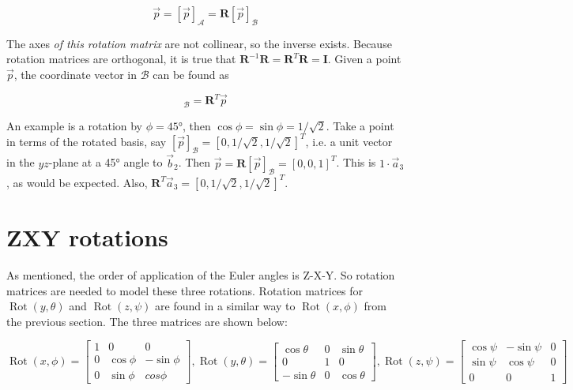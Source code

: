 \documentclass[a4paper]{report}
\DeclareMathOperator{\Rot}{Rot}
\newcommand{\matr}[1]{\mathbf{#1}}
\begin{document}
\begin{equation}
\vec{p} = [\vec{p}]_\mathcal{A} = \matr{R} [\vec{p}]_\mathcal{B}
\end{equation}

The axes \textit{of this rotation matrix} are not collinear, so the inverse exists. Because rotation matrices are orthogonal, it is true that $\matr{R}^{-1} \matr{R} = \matr{R}^{T} \matr{R} = \matr{I}$. Given a point $\vec{p}$, the coordinate vector in $\mathcal{B}$ can be found as 

\begin{equation}
[\vec{p}]_\mathcal{B} = \matr{R}^T \vec{p}
\end{equation}

An example is a rotation by $\phi=45$°, then $\cos \phi = \sin \phi = 1/\sqrt{2}$.
Take a point in terms of the rotated basis, say $[\vec{p}]_\mathcal{B} = [0, 1/\sqrt{2}, 1/\sqrt{2}]^T$, i.e. a unit vector in the $yz$-plane at a 45° angle to $\vec{b}_2$.
Then $\vec{p}=\matr{R} [\vec{p}]_\mathcal{B} = [0, 0, 1 ]^T$. This is $1 \cdot \vec{a}_3$, as would be expected.
Also, $\matr{R}^T \vec{a}_3 = [0, 1/\sqrt{2}, 1/\sqrt{2}]^T$.

\section{ZXY rotations}

As mentioned, the order of application of the Euler angles is Z-X-Y.
So rotation matrices are needed to model these three rotations. Rotation matrices for $\Rot(y, \theta)$ and $\Rot(z, \psi)$ are found in a similar way to $\Rot(x, \phi)$ from the previous section. The three matrices are shown below:

\begin{equation}
\Rot(x, \phi)=
\begin{bmatrix}
1 & 0 & 0\\
0 & \cos\phi & -\sin\phi \\
0 & \sin\phi & cos\phi
\end{bmatrix},
\Rot(y, \theta)=
\begin{bmatrix}
\cos\theta & 0 &  \sin\theta \\
0 & 1 & 0 \\
-\sin\theta & 0 & \cos\theta
\end{bmatrix},
\Rot(z, \psi)=
\begin{bmatrix}
\cos\psi & -\sin\psi &  0\\
\sin\psi & \cos\psi & 0 \\
0 & 0 & 1
\end{bmatrix}
\end{equation}
\end{document}
